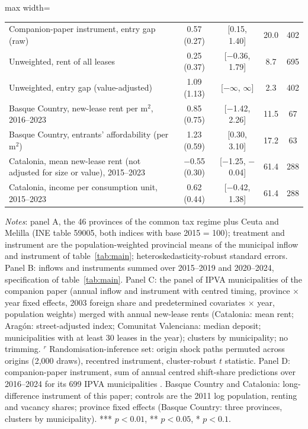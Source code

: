 \begin{table}[!htbp]
\begin{adjustbox}{max width=\linewidth}
\begin{tabular}{lcccc}
Companion-paper instrument, entry gap (raw) & 0.57 (0.27) & [0.15, 1.40] & 20.0 & 402\\
Unweighted, rent of all leases & 0.25 (0.37) & [$-$0.36, 1.79] & 8.7 & 695\\
Unweighted, entry gap (value-adjusted) & 1.09 (1.13) & [$-\infty$, $\infty$] & 2.3 & 402\\
Basque Country, new-lease rent per m$^2$, 2016--2023 & 0.85 (0.75) & [$-$1.42, 2.26] & 11.5 & 67\\
Basque Country, entrants' affordability (per m$^2$) & 1.23 (0.59) & [0.30, 3.10] & 17.2 & 63\\
Catalonia, mean new-lease rent (not adjusted for size or value), 2015--2023 & $-$0.55 (0.30) & [$-$1.25, $-$0.04] & 61.4 & 288\\
Catalonia, income per consumption unit, 2015--2023 & 0.62 (0.44) & [$-$0.42, 1.38] & 61.4 & 288\\
\bottomrule\end{tabular}\end{adjustbox}
\begin{minipage}{0.97\linewidth}\footnotesize\vspace{4pt}
\textit{Notes}: panel A, the 46 provinces of the common tax regime plus Ceuta and Melilla (INE table 59005, both indices with base 2015 = 100); treatment and instrument are the population-weighted provincial means of the municipal inflow and instrument of table~\ref{tab:main}; heteroskedasticity-robust standard errors. Panel B: inflows and instruments summed over 2015--2019 and 2020--2024, specification of table~\ref{tab:main}. Panel C: the panel of IPVA municipalities of the companion paper (annual inflow and instrument with centred timing, province $\times$ year fixed effects, 2003 foreign share and predetermined covariates $\times$ year, population weights) merged with annual new-lease rents (Catalonia: mean rent; Aragón: street-adjusted index; Comunitat Valenciana: median deposit; municipalities with at least 30 leases in the year); clusters by municipality; no trimming. $^r$ Randomisation-inference set: origin shock paths permuted across origins (2,000 draws), recentred instrument, cluster-robust $t$ statistic. Panel D: companion-paper instrument, sum of annual centred shift-share predictions over 2016--2024 for its 699 IPVA municipalities \citep{fernandez2026}. Basque Country and Catalonia: long-difference instrument of this paper; controls are the 2011 log population, renting and vacancy shares; province fixed effects (Basque Country: three provinces, clusters by municipality). *** $p<0.01$, ** $p<0.05$, * $p<0.1$.
\end{minipage}\end{table}